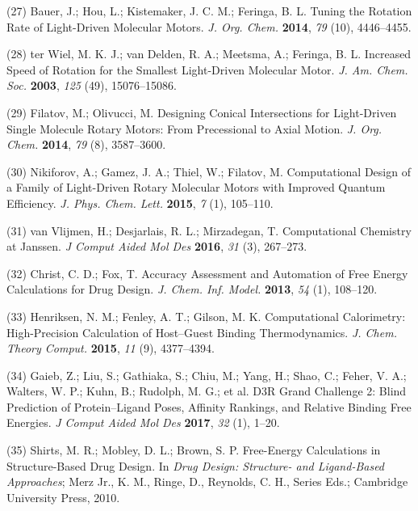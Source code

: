 \documentclass[11pt,notitlepage]{article}
\begin{document}
\leavevmode\hypertarget{ref-MVPWALSk}{}%
(27) Bauer, J.; Hou, L.; Kistemaker, J. C. M.; Feringa, B. L. Tuning the
Rotation Rate of Light-Driven Molecular Motors. \emph{J. Org. Chem.}
\textbf{2014}, \emph{79} (10), 4446--4455.

\leavevmode\hypertarget{ref-1F5wsgY82}{}%
(28) ter Wiel, M. K. J.; van Delden, R. A.; Meetsma, A.; Feringa, B. L.
Increased Speed of Rotation for the Smallest Light-Driven Molecular
Motor. \emph{J. Am. Chem. Soc.} \textbf{2003}, \emph{125} (49),
15076--15086.

\leavevmode\hypertarget{ref-Ewc7FKL8}{}%
(29) Filatov, M.; Olivucci, M. Designing Conical Intersections for
Light-Driven Single Molecule Rotary Motors: From Precessional to Axial
Motion. \emph{J. Org. Chem.} \textbf{2014}, \emph{79} (8), 3587--3600.

\leavevmode\hypertarget{ref-122TltEto}{}%
(30) Nikiforov, A.; Gamez, J. A.; Thiel, W.; Filatov, M. Computational
Design of a Family of Light-Driven Rotary Molecular Motors with Improved
Quantum Efficiency. \emph{J. Phys. Chem. Lett.} \textbf{2015}, \emph{7}
(1), 105--110.

\leavevmode\hypertarget{ref-1FiDpP1LR}{}%
(31) van Vlijmen, H.; Desjarlais, R. L.; Mirzadegan, T. Computational
Chemistry at Janssen. \emph{J Comput Aided Mol Des} \textbf{2016},
\emph{31} (3), 267--273.

\leavevmode\hypertarget{ref-1BwXH3GFO}{}%
(32) Christ, C. D.; Fox, T. Accuracy Assessment and Automation of Free
Energy Calculations for Drug Design. \emph{J. Chem. Inf. Model.}
\textbf{2013}, \emph{54} (1), 108--120.

\leavevmode\hypertarget{ref-1935a9V0d}{}%
(33) Henriksen, N. M.; Fenley, A. T.; Gilson, M. K. Computational
Calorimetry: High-Precision Calculation of Host--Guest Binding
Thermodynamics. \emph{J. Chem. Theory Comput.} \textbf{2015}, \emph{11}
(9), 4377--4394.

\leavevmode\hypertarget{ref-LWd10vQy}{}%
(34) Gaieb, Z.; Liu, S.; Gathiaka, S.; Chiu, M.; Yang, H.; Shao, C.;
Feher, V. A.; Walters, W. P.; Kuhn, B.; Rudolph, M. G.; et al. D3R Grand
Challenge 2: Blind Prediction of Protein--Ligand Poses, Affinity
Rankings, and Relative Binding Free Energies. \emph{J Comput Aided Mol
Des} \textbf{2017}, \emph{32} (1), 1--20.

\leavevmode\hypertarget{ref-fC0t6Cy1}{}%
(35) Shirts, M. R.; Mobley, D. L.; Brown, S. P. Free-Energy Calculations
in Structure-Based Drug Design. In \emph{Drug Design: Structure- and
Ligand-Based Approaches}; Merz Jr., K. M., Ringe, D., Reynolds, C. H.,
Series Eds.; Cambridge University Press, 2010.
\end{document}
